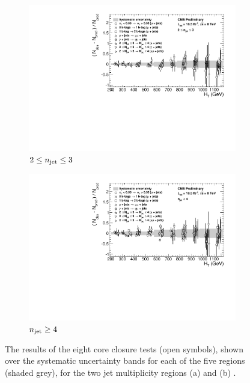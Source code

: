 \begin{figure}[ht!]
  \centering
  \begin{subfigure}[b]{0.7\textwidth}
    \includegraphics[width=\textwidth]{Figs/syst/v0/le3j/summary_plot}
    \caption{$2 \leq n_{\text{jet}} \leq 3$}
    \label{fig:closure_summary_le3j}
  \end{subfigure}             
  \begin{subfigure}[b]{0.7\textwidth}
    \includegraphics[width=\textwidth]{Figs/syst/v0/ge4j/summary_plot}
    \caption{$n_{\text{jet}} \geq 4$}
    \label{fig:closure_summary_ge4j}
  \end{subfigure}
  \caption{The results of the eight core closure tests (open symbols), shown 
  over the systematic uncertainty bands for each of the five \HT regions
  (shaded grey), for the two jet multiplicity regions (a) \njlow and (b) \njhigh.}
  \label{fig:closure_summary}
\end{figure}

